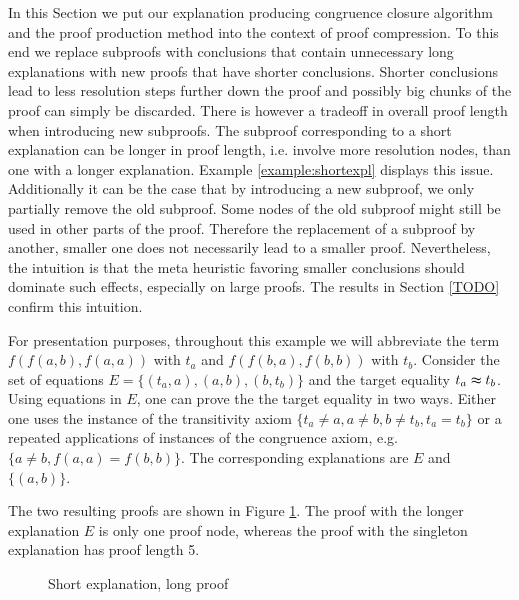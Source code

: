 In this Section we put our explanation producing congruence closure algorithm and the proof production method into the context of proof compression.
To this end we replace subproofs with conclusions that contain unnecessary long explanations with new proofs that have shorter conclusions.
Shorter conclusions lead to less resolution steps further down the proof and possibly big chunks of the proof can simply be discarded.
There is however a tradeoff in overall proof length when introducing new subproofs.
The subproof corresponding to a short explanation can be longer in proof length, i.e. involve more resolution nodes, than one with a longer explanation.
Example \ref{example:shortexpl} displays this issue.
Additionally it can be the case that by introducing a new subproof, we only partially remove the old subproof.
Some nodes of the old subproof might still be used in other parts of the proof.
Therefore the replacement of a subproof by another, smaller one does not necessarily lead to a smaller proof.
Nevertheless, the intuition is that the meta heuristic favoring smaller conclusions should dominate such effects, especially on large proofs.
The results in Section \ref{TODO} confirm this intuition.


\begin{example}
\label{example:shortexpl}
For presentation purposes, throughout this example we will abbreviate the term $f(f(a,b),f(a,a))$ with $t_a$ and $f(f(b,a),f(b,b))$ with $t_b$.
Consider the set of equations $E = \{(t_a,a),(a,b),(b,t_b)\}$ and the target equality $t_a \thickapprox t_b$.
Using equations in $E$, one can prove the the target equality in two ways.
Either one uses the instance of the transitivity axiom $\{t_a \neq a, a \neq b, b \neq t_b, t_a = t_b\}$ or a repeated applications of instances of the congruence axiom, e.g. $\{a \neq b, f(a,a) = f(b,b)\}$.
The corresponding explanations are $E$ and $\{(a,b)\}$.

The two resulting proofs are shown in Figure \ref{fig:short_expl_proof}.
The proof with the longer explanation $E$ is only one proof node, whereas the proof with the singleton explanation has proof length 5.

%
%
%

\begin{figure}[!h]

\caption{Short explanation, long proof}
\label{fig:short_expl_proof}
\end{figure}

\end{example}

